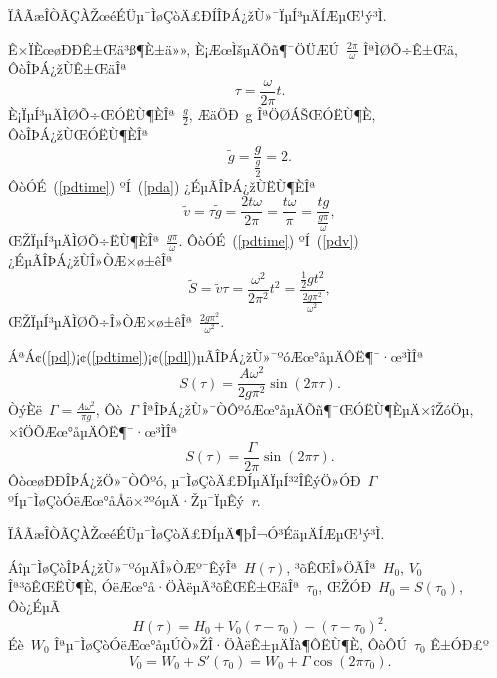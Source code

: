 \documentclass[12pt,openany,CJK,oneside]{cctbook}
\begin{document}
{ÏÂÃæÎÒÃÇÀŽœéÉÜµ¯ÌøÇòÄ£ÐÍÎÞÁ¿žÙ»¯ÏµÍ³µÄÍÆµŒ¹ý³Ì.

Ê×ÏÈœøÐÐÊ±Œä³ß¶È±ä»», È¡ÆœÌšµÄÕñ¶¯ÖÜÆÚ\ $\frac{2\pi}{\omega}$ ÎªÌØÕ÷Ê±Œä, ÔòÎÞÁ¿žÙÊ±ŒäÎª
\begin{equation}\label{pdtime}
  \tau=\frac{\omega}{2\pi}t.
\end{equation}
È¡ÏµÍ³µÄÌØÕ÷ŒÓËÙ¶ÈÎª\ $\frac{g}{2}$, ÆäÖÐ\ g ÎªÖØÁŠŒÓËÙ¶È, ÔòÎÞÁ¿žÙŒÓËÙ¶ÈÎª
\begin{equation}\label{pda}
  \tilde{g}=\frac{g}{\frac{g}{2}}=2.
\end{equation}
ÔòÓÉ\ (\ref{pdtime}) ºÍ\ (\ref{pda}) ¿ÉµÃÎÞÁ¿žÙËÙ¶ÈÎª
\begin{equation}\label{pdv}
  \tilde{v}=\tau\tilde{g}=\frac{2t\omega}{2\pi}=\frac{t\omega}{\pi}=\frac{tg}{\frac{g\pi}{\omega}},
\end{equation}
ŒŽÏµÍ³µÄÌØÕ÷ËÙ¶ÈÎª\ $\frac{g\pi}{\omega}$.
ÔòÓÉ\ (\ref{pdtime}) ºÍ\ (\ref{pdv}) ¿ÉµÃÎÞÁ¿žÙÎ»ÒÆ×ø±êÎª
\begin{equation}\label{pdl}
  \tilde{S}=\tilde{v}\tau=\frac{\omega^2}{2\pi^2}t^2=\frac{\frac{1}{2}gt^2}{\frac{2g\pi^2}{\omega^2}},
\end{equation}
ŒŽÏµÍ³µÄÌØÕ÷Î»ÒÆ×ø±êÎª\ $\frac{2g\pi^2}{\omega^2}$.

ÁªÁ¢(\ref{pd})¡¢(\ref{pdtime})¡¢(\ref{pdl})µÃÎÞÁ¿žÙ»¯ºóÆœ°åµÄÔË¶¯·œ³ÌÎª
\begin{equation}\label{pds}
  S(\tau)=\frac{A\omega^2}{2g\pi^2}\sin(2\pi\tau).
\end{equation}
ÒýÈë\ $\Gamma=\frac{A\omega^2}{\pi g}$, Ôò\ $\Gamma$ ÎªÎÞÁ¿žÙ»¯ÒÔºóÆœ°åµÄÕñ¶¯ŒÓËÙ¶ÈµÄ×îŽóÖµ, ×îÖÕÆœ°åµÄÔË¶¯·œ³ÌÎª
\begin{equation}\label{pdf}
  S(\tau)=\frac{\Gamma}{2\pi}\sin(2\pi\tau).
\end{equation}
ÔòœøÐÐÎÞÁ¿žÖ»¯ÒÔºó, µ¯ÌøÇòÄ£ÐÍµÄÏµÍ³²ÎÊýÖ»ÓÐ\ $\Gamma$ ºÍµ¯ÌøÇòÓëÆœ°åÅö×²ºóµÄ·Žµ¯ÏµÊý\ \emph{r}.

ÏÂÃæÎÒÃÇÀŽœéÉÜµ¯ÌøÇòÄ£ÐÍµÄ¶þÎ¬Ó³ÉäµÄÍÆµŒ¹ý³Ì.

Áîµ¯ÌøÇòÎÞÁ¿žÙ»¯ºóµÄÎ»ÒÆº¯ÊýÎª\ $H(\tau)$, ³õÊŒÎ»ÖÃÎª\ $H_0$, $V_0$ Îª³õÊŒËÙ¶È, ÓëÆœ°å·ÖÀëµÄ³õÊŒÊ±ŒäÎª\ $\tau_0$, ŒŽÓÐ\ $H_0=S(\tau_0)$, Ôò¿ÉµÃ
\begin{equation}\label{ballh}
  H(\tau)=H_0+V_0(\tau-\tau_0)-(\tau-\tau_0)^2.
\end{equation}
Éè\ $W_0$ Îªµ¯ÌøÇòÓëÆœ°åµÚÒ»ŽÎ·ÖÀëÊ±µÄÏà¶ÔËÙ¶È, ÔòÔÚ\ $\tau_0$ Ê±ÓÐ£º
\begin{equation}\label{ballw}
  V_0=W_0+S'(\tau_0)=W_0+\Gamma\cos(2\pi\tau_0).
\end{equation}

}
\end{document}
